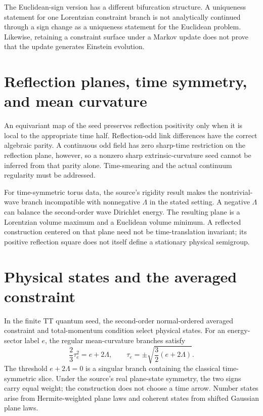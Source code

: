 \documentclass[11pt,a4paper,oneside]{book}
\theoremstyle{plain}
\theoremstyle{definition}
\theoremstyle{remark}
\newcommand{\src}[2]{\cite{#1}}
\begin{document}
The Euclidean-sign version has a different bifurcation structure. A uniqueness statement for one Lorentzian constraint branch is not analytically continued through a sign change as a uniqueness statement for the Euclidean problem. Likewise, retaining a constraint surface under a Markov update does not prove that the update generates Einstein evolution.

\section{Reflection planes, time symmetry, and mean curvature}
An equivariant map of the seed preserves reflection positivity only when it is local to the appropriate time half. Reflection-odd link differences have the correct algebraic parity. A continuous odd field has zero sharp-time restriction on the reflection plane, however, so a nonzero sharp extrinsic-curvature seed cannot be inferred from that parity alone. Time-smearing and the actual continuum regularity must be addressed. \cite{R19}

For time-symmetric torus data, the source's rigidity result makes the nontrivial-wave branch incompatible with nonnegative $\Lambda$ in the stated setting. A negative $\Lambda$ can balance the second-order wave Dirichlet energy. The resulting plane is a Lorentzian volume maximum and a Euclidean volume minimum. A reflected construction centered on that plane need not be time-translation invariant; its positive reflection square does not itself define a stationary physical semigroup. \src{R19}{thm:v19v64-consolidated}

\section{Physical states and the averaged constraint}
In the finite TT quantum seed, the second-order normal-ordered averaged constraint and total-momentum condition select physical states. For an energy-sector label $e$, the regular mean-curvature branches satisfy
\begin{equation}
 \frac23\tau_e^2=e+2\Lambda,
 \qquad\tau_e=\pm\sqrt{\frac32(e+2\Lambda)}.
 \label{eq:tau-branches}
\end{equation}
The threshold $e+2\Lambda=0$ is a singular branch containing the classical time-symmetric slice. Under the source's real plane-state symmetry, the two signs carry equal weight; the construction does not choose a time arrow. Number states arise from Hermite-weighted plane laws and coherent states from shifted Gaussian plane laws. \src{R19}{thm:v19v64-consolidated}
\end{document}
